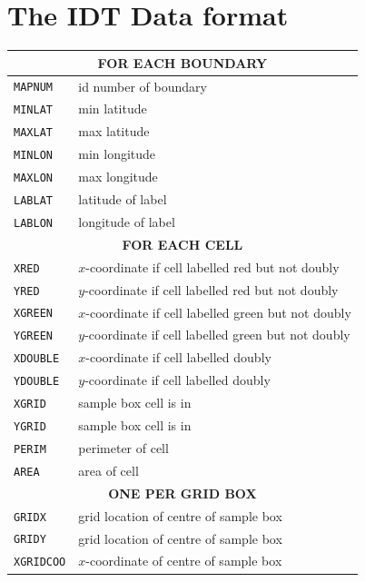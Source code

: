 \documentclass{book}
\begin{document}
\chapter{The IDT Data format}
\label{manual:sec:reading-data}

\begin{table}
  \begin{tabular}{ll}
    \hline
    \multicolumn{2}{c}{\textbf{FOR EACH BOUNDARY}} \\
    \hline
    \texttt{MAPNUM}   & id number of boundary \\  
    \texttt{MINLAT}   & min latitude      \\
    \texttt{MAXLAT}   & max latitude      \\
    \texttt{MINLON}   & min longitude     \\
    \texttt{MAXLON}   & max longitude     \\
    \texttt{LABLAT}   & latitude of label \\
    \texttt{LABLON}   & longitude of label\\
    \hline
    \multicolumn{2}{c}{\textbf{FOR EACH CELL}} \\
    \hline
    \texttt{XRED}     & $x$-coordinate if cell labelled red but not doubly\\
    \texttt{YRED}     & $y$-coordinate if cell labelled red but not doubly\\
    \texttt{XGREEN}   & $x$-coordinate if cell labelled green but not doubly\\
    \texttt{YGREEN}   & $y$-coordinate if cell labelled green but not doubly\\
    \texttt{XDOUBLE}  & $x$-coordinate if cell labelled doubly\\ 
    \texttt{YDOUBLE}  & $y$-coordinate if cell labelled doubly\\
    \texttt{XGRID}    & sample box cell is in \\
    \texttt{YGRID}    & sample box cell is in \\
    \texttt{PERIM}    & perimeter of cell \\
    \texttt{AREA}     & area of cell \\
    \hline
    \multicolumn{2}{c}{\textbf{ONE PER GRID BOX}} \\
    \hline
    \texttt{GRIDX}    & grid location of centre of sample box \\
    \texttt{GRIDY}    & grid location of centre of sample box \\
    \texttt{XGRIDCOO} & $x$-coordinate of centre of sample box \\

\end{tabular}
\end{table}
\end{document}
